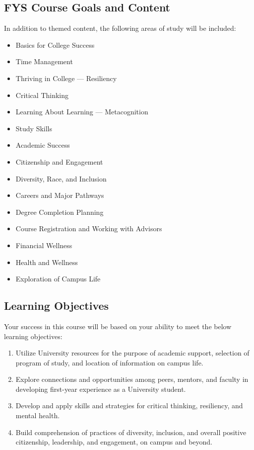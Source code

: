 \documentclass[11pt,letterpaper]{article}
\begin{document}
\subsection{FYS Course Goals and Content}
In addition to themed content, the following areas of study will be included:
\begin{multicols}{2}
	\raggedright
	\begin{itemize}[nosep]
		\item Basics for College Success
		\item Time Management
		\item Thriving in College --- Resiliency
		\item Critical Thinking
		\item Learning About Learning --- Metacognition
		\item Study Skills
		\item Academic Success
		\item Citizenship and Engagement
		\item Diversity, Race, and Inclusion
		\item Careers and Major Pathways
		\item Degree Completion Planning
		\item Course Registration and Working with Advisors
		\item Financial Wellness
		\item Health and Wellness
		\item Exploration of Campus Life
	\end{itemize}
\end{multicols}

\subsection{Learning Objectives}
Your success in this course will be based on your ability to meet the below
learning objectives:
\begin{enumerate}
	\item Utilize University resources for the purpose of academic support,
		selection of program of study, and location of information on
		campus life.
	\item Explore connections and opportunities among peers, mentors, and
		faculty in developing first-year experience as a University
		student.
	\item Develop and apply skills and strategies for critical thinking,
		resiliency, and mental health.
	\item Build comprehension of practices of diversity, inclusion, and
		overall positive citizenship, leadership, and engagement, on
		campus and beyond.
\end{enumerate}
\end{document}
